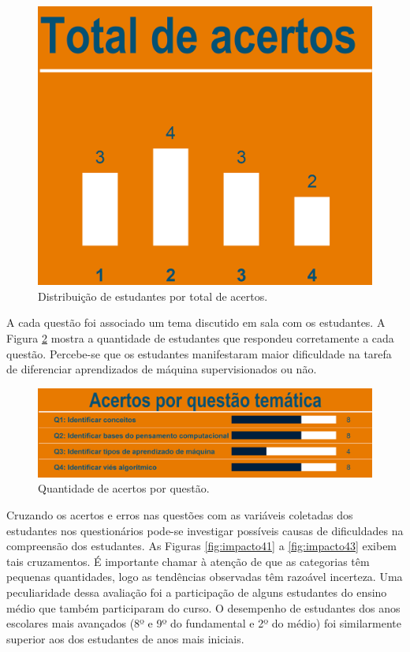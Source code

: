 \documentclass[
]{book}
\begin{document}
\begin{figure}

{\centering \includegraphics[width=0.75\linewidth,height=0.75\textheight]{images/Impactos/39} 

}

\caption{Distribuição de estudantes por total de acertos.}\label{fig:impacto39}
\end{figure}

A cada questão foi associado um tema discutido em sala com os estudantes. A Figura \ref{fig:impacto40} mostra a quantidade de estudantes que respondeu corretamente a cada questão. Percebe-se que os estudantes manifestaram maior dificuldade na tarefa de diferenciar aprendizados de máquina supervisionados ou não.

\begin{figure}

{\centering \includegraphics[width=0.75\linewidth,height=0.75\textheight]{images/Impactos/40} 

}

\caption{Quantidade de acertos por questão.}\label{fig:impacto40}
\end{figure}

Cruzando os acertos e erros nas questões com as variáveis coletadas dos estudantes nos questionários pode-se investigar possíveis causas de dificuldades na compreensão dos estudantes. As Figuras \ref{fig:impacto41} a \ref{fig:impacto43} exibem tais cruzamentos. É importante chamar à atenção de que as categorias têm pequenas quantidades, logo as tendências observadas têm razoável incerteza. Uma peculiaridade dessa avaliação foi a participação de alguns estudantes do ensino médio que também participaram do curso. O desempenho de estudantes dos anos escolares mais avançados (8º e 9º do fundamental e 2º do médio) foi similarmente superior aos dos estudantes de anos mais iniciais.
\end{document}
